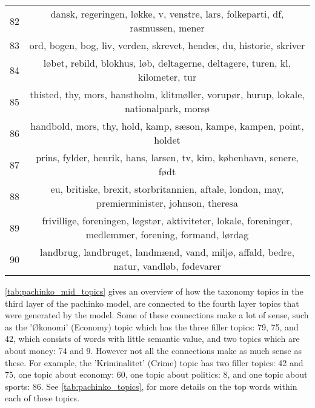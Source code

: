 \begin{longtable}[c]{c | c}
		82 & dansk, regeringen, løkke, v, venstre, lars, folkeparti, df, rasmussen, mener \\
		83 & ord, bogen, bog, liv, verden, skrevet, hendes, du, historie, skriver \\
		84 & løbet, rebild, blokhus, løb, deltagerne, deltagere, turen, kl, kilometer, tur \\
		85 & thisted, thy, mors, hanstholm, klitmøller, vorupør, hurup, lokale, nationalpark, morsø \\
		86 & handbold, mors, thy, hold, kamp, sæson, kampe, kampen, point, holdet \\
		87 & prins, fylder, henrik, hans, larsen, tv, kim, københavn, senere, født \\
		88 & eu, britiske, brexit, storbritannien, aftale, london, may, premierminister, johnson, theresa \\
		89 & frivillige, foreningen, løgstør, aktiviteter, lokale, foreninger, medlemmer, forening, formand, lørdag \\
		90 & landbrug, landbruget, landmænd, vand, miljø, affald, bedre, natur, vandløb, fødevarer \\
\end{longtable}

\autoref{tab:pachinko_mid_topics} gives an overview of how the taxonomy topics in the third layer of the pachinko model, are connected to the fourth layer topics that were generated by the model.
Some of these connections make a lot of sense, such as the 'Økonomi' (Economy) topic which has the three filler topics: 79, 75, and 42, which consists of words with little semantic value, and two topics which are about money: 74 and 9.
However not all the connections make as much sense as these. 
For example, the 'Kriminalitet' (Crime) topic has two filler topics: 42 and 75, one topic about economy: 60, one topic about politics: 8, and one topic about sports: 86.
See \autoref{tab:pachinko_topics}, for more details on the top words within each of these topics.

